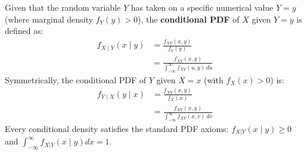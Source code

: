 \documentclass[12pt,a4paper]{article}
\begin{document}
\begin{tcolorbox}[defbox, title={\textbf{Definition: Conditional Probability Density Function}}]
Given that the random variable $Y$ has taken on a specific numerical value $Y = y$ (where marginal density $f_Y(y) > 0$), the \textbf{conditional PDF} of $X$ given $Y = y$ is defined as:
\begin{equation}
  \begin{aligned}
    f_{X \mid Y}(x \mid y) &= \frac{f_{XY}(x, y)}{f_Y(y)} \\[3pt]
    &= \frac{f_{XY}(x, y)}{\displaystyle\int_{-\infty}^\infty f_{XY}(u, y) \, du}
  \end{aligned}
\end{equation}
Symmetrically, the conditional PDF of $Y$ given $X = x$ (with $f_X(x) > 0$) is:
\begin{equation}
  \begin{aligned}
    f_{Y \mid X}(y \mid x) &= \frac{f_{XY}(x, y)}{f_X(x)} \\[3pt]
    &= \frac{f_{XY}(x, y)}{\displaystyle\int_{-\infty}^\infty f_{XY}(x, v) \, dv}
  \end{aligned}
\end{equation}
Every conditional density satisfies the standard PDF axioms: $f_{X|Y}(x \mid y) \ge 0$ and $\int_{-\infty}^\infty f_{X|Y}(x \mid y) dx = 1$.
\end{tcolorbox}
\end{document}
